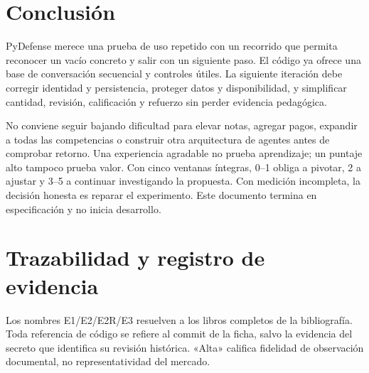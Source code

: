 \documentclass[11pt,a4paper]{report}
\begin{document}
\chapter{Conclusión}
PyDefense merece una prueba de uso repetido con un recorrido que permita reconocer un vacío concreto y salir con un siguiente paso. El código ya ofrece una base de conversación secuencial y controles útiles. La siguiente iteración debe corregir identidad y persistencia, proteger datos y disponibilidad, y simplificar cantidad, revisión, calificación y refuerzo sin perder evidencia pedagógica.

No conviene seguir bajando dificultad para elevar notas, agregar pagos, expandir a todas las competencias o construir otra arquitectura de agentes antes de comprobar retorno. Una experiencia agradable no prueba aprendizaje; un puntaje alto tampoco prueba valor. Con cinco ventanas íntegras, 0--1 obliga a pivotar, 2 a ajustar y 3--5 a continuar investigando la propuesta. Con medición incompleta, la decisión honesta es reparar el experimento. Este documento termina en especificación y no inicia desarrollo.

\appendix
\chapter{Trazabilidad y registro de evidencia}
\label{ap:traza}
Los nombres E1/E2/E2R/E3 resuelven a los libros completos de la bibliografía. Toda referencia de código se refiere al commit de la ficha, salvo la evidencia del secreto que identifica su revisión histórica. «Alta» califica fidelidad de observación documental, no representatividad del mercado.
\end{document}
